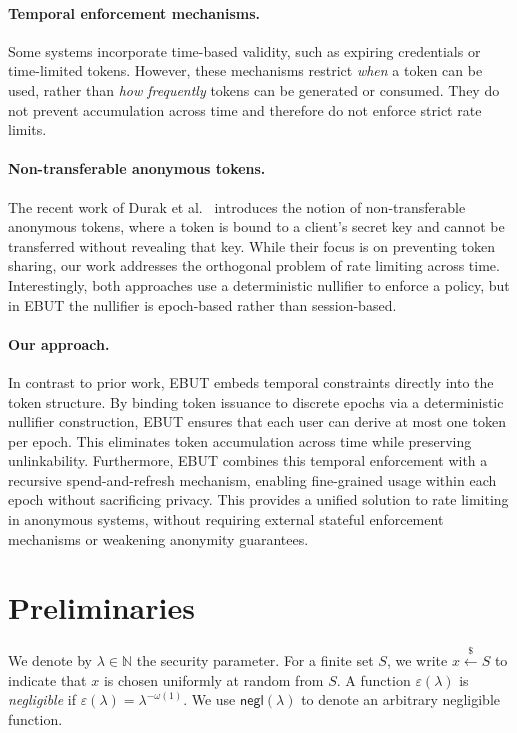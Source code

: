 \documentclass[11pt]{article}
\theoremstyle{definitionstyle}
\theoremstyle{plain}
\begin{document}
\paragraph{Temporal enforcement mechanisms.} Some systems incorporate time-based validity, such as expiring credentials or time-limited tokens. However, these mechanisms restrict \emph{when} a token can be used, rather than \emph{how frequently} tokens can be generated or consumed. They do not prevent accumulation across time and therefore do not enforce strict rate limits.

\paragraph{Non-transferable anonymous tokens.} The recent work of Durak et al.~\cite{NTAT} introduces the notion of non-transferable anonymous tokens, where a token is bound to a client's secret key and cannot be transferred without revealing that key. While their focus is on preventing token sharing, our work addresses the orthogonal problem of rate limiting across time. Interestingly, both approaches use a deterministic nullifier to enforce a policy, but in EBUT the nullifier is epoch-based rather than session-based.

\paragraph{Our approach.} In contrast to prior work, EBUT embeds temporal constraints directly into the token structure. By binding token issuance to discrete epochs via a deterministic nullifier construction, EBUT ensures that each user can derive at most one token per epoch. This eliminates token accumulation across time while preserving unlinkability. Furthermore, EBUT combines this temporal enforcement with a recursive spend-and-refresh mechanism, enabling fine-grained usage within each epoch without sacrificing privacy. This provides a unified solution to rate limiting in anonymous systems, without requiring external stateful enforcement mechanisms or weakening anonymity guarantees.

\section{Preliminaries}
We denote by $\lambda \in \mathbb{N}$ the security parameter. For a finite set $S$, we write $x \xleftarrow{\$} S$ to indicate that $x$ is chosen uniformly at random from $S$. A function $\varepsilon(\lambda)$ is \emph{negligible} if $\varepsilon(\lambda) = \lambda^{-\omega(1)}$. We use $\mathsf{negl}(\lambda)$ to denote an arbitrary negligible function.
\end{document}
